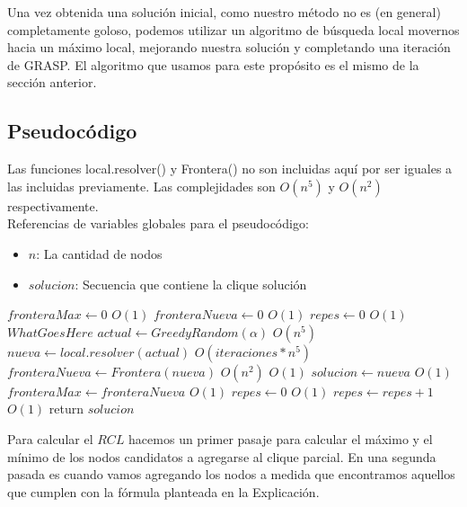 Una vez obtenida una solución inicial, como nuestro método no es (en general) completamente goloso, podemos utilizar un algoritmo de búsqueda local movernos hacia un máximo local, mejorando nuestra solución y completando una iteración de GRASP. El algoritmo que usamos para este propósito es el mismo de la sección anterior.

\subsection{Pseudocódigo}

Las funciones local.resolver() y Frontera() no son incluidas aquí por ser iguales a las incluidas previamente. Las complejidades son $O(n^5)$ y $O(n^2)$ respectivamente. \\

Referencias de variables globales para el pseudocódigo:
\begin{itemize}
    \item $n$: La cantidad de nodos
    \item $solucion$: Secuencia que contiene la clique solución
\end{itemize}


\begin{algorithm}[H]
\begin{algorithmic}
    \State $fronteraMax \gets 0$   \Comment $O(1)$
    \State $fronteraNueva \gets 0$   \Comment $O(1)$
    \State $repes \gets 0$   \Comment $O(1)$
      \Comment $What Goes Here$
        \State $actual \gets GreedyRandom(\alpha)$  \Comment $O(n^5)$
        \State $nueva \gets local.resolver(actual)$  \Comment $O(iteraciones * n^5)$
        \State $fronteraNueva \gets Frontera(nueva)$  \Comment $O(n^2)$
           \Comment $O(1)$
            \State $solucion \gets nueva$   \Comment $O(1)$
            \State $fronteraMax \gets fronteraNueva$   \Comment $O(1)$
            \State $repes \gets 0$   \Comment $O(1)$
        \Else
            \State $repes \gets repes + 1$   \Comment $O(1)$
        \EndIf
    \EndWhile
    \State return $solucion$
\EndFunction
\end{algorithmic}
\end{algorithm}

Para calcular el $RCL$ hacemos un primer pasaje para calcular el máximo y el mínimo de los nodos candidatos a agregarse al clique parcial. En una segunda pasada es cuando vamos agregando los nodos a medida que encontramos aquellos que cumplen con la fórmula planteada en la Explicación.

